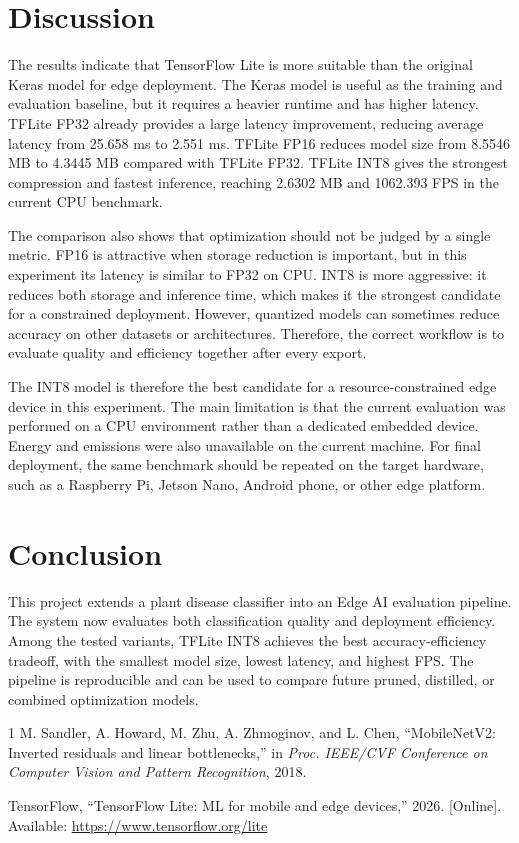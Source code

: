 \documentclass[10pt,journal,onecolumn]{IEEEtran}
\begin{document}
\section{Discussion}
The results indicate that TensorFlow Lite is more suitable than the original Keras model for edge deployment. The Keras model is useful as the training and evaluation baseline, but it requires a heavier runtime and has higher latency. TFLite FP32 already provides a large latency improvement, reducing average latency from 25.658 ms to 2.551 ms. TFLite FP16 reduces model size from 8.5546 MB to 4.3445 MB compared with TFLite FP32. TFLite INT8 gives the strongest compression and fastest inference, reaching 2.6302 MB and 1062.393 FPS in the current CPU benchmark.

The comparison also shows that optimization should not be judged by a single metric. FP16 is attractive when storage reduction is important, but in this experiment its latency is similar to FP32 on CPU. INT8 is more aggressive: it reduces both storage and inference time, which makes it the strongest candidate for a constrained deployment. However, quantized models can sometimes reduce accuracy on other datasets or architectures. Therefore, the correct workflow is to evaluate quality and efficiency together after every export.

The INT8 model is therefore the best candidate for a resource-constrained edge device in this experiment. The main limitation is that the current evaluation was performed on a CPU environment rather than a dedicated embedded device. Energy and emissions were also unavailable on the current machine. For final deployment, the same benchmark should be repeated on the target hardware, such as a Raspberry Pi, Jetson Nano, Android phone, or other edge platform.

\section{Conclusion}
This project extends a plant disease classifier into an Edge AI evaluation pipeline. The system now evaluates both classification quality and deployment efficiency. Among the tested variants, TFLite INT8 achieves the best accuracy-efficiency tradeoff, with the smallest model size, lowest latency, and highest FPS. The pipeline is reproducible and can be used to compare future pruned, distilled, or combined optimization models.

\begin{thebibliography}{1}
M. Sandler, A. Howard, M. Zhu, A. Zhmoginov, and L. Chen, ``MobileNetV2: Inverted residuals and linear bottlenecks,'' in \emph{Proc. IEEE/CVF Conference on Computer Vision and Pattern Recognition}, 2018.

TensorFlow, ``TensorFlow Lite: ML for mobile and edge devices,'' 2026. [Online]. Available: \url{https://www.tensorflow.org/lite}
\end{thebibliography}
\end{document}
